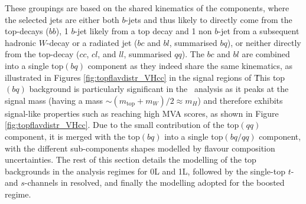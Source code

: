 These groupings are based on the shared kinematics of the components, where the selected jets are either both $b$-jets and thus likely to directly come from the top-decays ($bb$), 1 $b$-jet likely from a top decay and 1 non $b$-jet from a subsequent hadronic $W$-decay or a radiated jet ($bc$ and $bl$, summarised $bq$), or neither directly from the top-decay ($cc$, $cl$, and $ll$, summarised $qq$). The $bc$ and $bl$ are combined into a single top$(bq)$ component as they indeed share the same kinematics, as illustrated in Figures \ref{fig:topflavdistr_VHcc} in the signal regions of \vhc\. This top$(bq)$ background is particularly significant in the \vhc\ analysis as it peaks at the signal mass (having a mass $\sim (m_{\text{top}} + m_W) / 2 \approx m_H$) and therefore exhibits signal-like properties such as reaching high MVA scores, as shown in Figure \ref{fig:topflavdistr_VHcc}. Due to the small contribution of the top$(qq)$ component, it is merged with the top$(bq)$ into a single top$(bq/qq)$ component, with the different sub-components shapes modelled by flavour composition uncertainties. The rest of this section details the modelling of the top backgrounds in the analysis regimes for 0L and 1L, followed by the single-top $t$- and $s$-channels in resolved, and finally the modelling adopted for the boosted regime.

